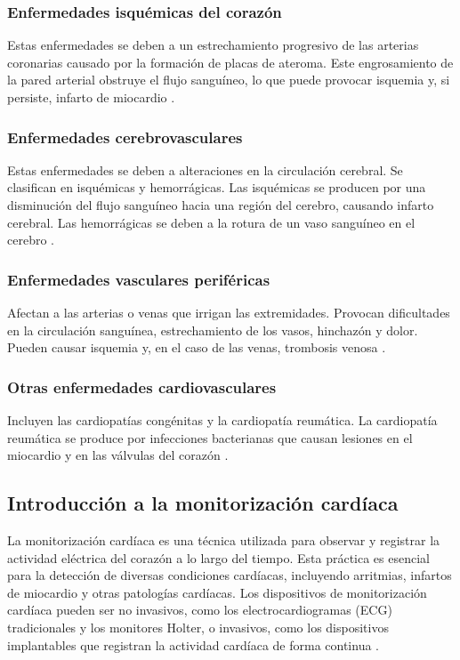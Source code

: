 \subsubsection{Enfermedades isquémicas del corazón}

Estas enfermedades se deben a un estrechamiento progresivo de las arterias coronarias causado por la formación de placas de ateroma. Este engrosamiento de la pared arterial obstruye el flujo sanguíneo, lo que puede provocar isquemia y, si persiste, infarto de miocardio \cite{corella2007enfermedades}.

\subsubsection{Enfermedades cerebrovasculares}

Estas enfermedades se deben a alteraciones en la circulación cerebral. Se clasifican en isquémicas y hemorrágicas. Las isquémicas se producen por una disminución del flujo sanguíneo hacia una región del cerebro, causando infarto cerebral. Las hemorrágicas se deben a la rotura de un vaso sanguíneo en el cerebro \cite{corella2007enfermedades}.

\subsubsection{Enfermedades vasculares periféricas}

Afectan a las arterias o venas que irrigan las extremidades. Provocan dificultades en la circulación sanguínea, estrechamiento de los vasos, hinchazón y dolor. Pueden causar isquemia y, en el caso de las venas, trombosis venosa \cite{corella2007enfermedades}.

\subsubsection{Otras enfermedades cardiovasculares}

Incluyen las cardiopatías congénitas y la cardiopatía reumática. La cardiopatía reumática se produce por infecciones bacterianas que causan lesiones en el miocardio y en las válvulas del corazón \cite{corella2007enfermedades}.

\subsection{Introducción a la monitorización cardíaca}

La monitorización cardíaca es una técnica utilizada para observar y registrar la actividad eléctrica del corazón a lo largo del tiempo. Esta práctica es esencial para la detección de diversas condiciones cardíacas, incluyendo arritmias, infartos de miocardio y otras patologías cardíacas. Los dispositivos de monitorización cardíaca pueden ser no invasivos, como los electrocardiogramas (ECG) tradicionales y los monitores Holter, o invasivos, como los dispositivos implantables que registran la actividad cardíaca de forma continua \cite{MayoClinic_monitoring}.

